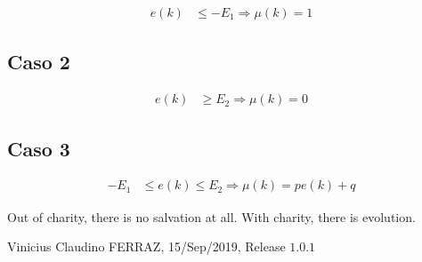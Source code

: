 \documentclass[12pt]{article}
\begin{document}
\begin{align}
  e(k) &\le - E_1 \Rightarrow \mu(k) = 1
\end{align}

\subsection{Caso 2}

\begin{align}
   e(k) &\ge E_2 \Rightarrow \mu(k) = 0
\end{align}

\subsection{Caso 3}

\begin{align}
  - E_1 &\le e(k) \le E_2 \Rightarrow \mu(k) = p e(k) + q
\end{align}

\vspace{3mm}

Out of charity, there is no salvation at all. With charity, there is evolution.

\vspace{3mm}

Vinicius Claudino FERRAZ, 15/Sep/2019, Release $1.0.1$
\end{document}
